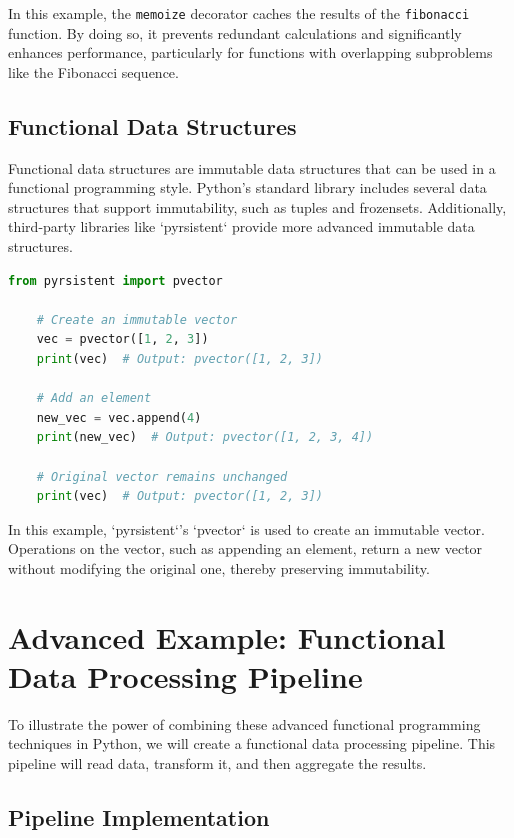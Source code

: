 \documentclass[a4paper]{article}
\begin{document}
In this example, the \texttt{memoize} decorator caches the results of the \texttt{fibonacci} function. By doing so, it prevents redundant calculations and significantly enhances performance, particularly for functions with overlapping subproblems like the Fibonacci sequence.

\subsection{Functional Data Structures}
Functional data structures are immutable data structures that can be used in a functional programming style. Python's standard library includes several data structures that support immutability, such as tuples and frozensets. Additionally, third-party libraries like `pyrsistent` provide more advanced immutable data structures.

\begin{lstlisting}[language=Python, caption=Functional Data Structures Example]
    from pyrsistent import pvector

    # Create an immutable vector
    vec = pvector([1, 2, 3])
    print(vec)  # Output: pvector([1, 2, 3])

    # Add an element
    new_vec = vec.append(4)
    print(new_vec)  # Output: pvector([1, 2, 3, 4])

    # Original vector remains unchanged
    print(vec)  # Output: pvector([1, 2, 3])
\end{lstlisting}

In this example, `pyrsistent`'s `pvector` is used to create an immutable vector. Operations on the vector, such as appending an element, return a new vector without modifying the original one, thereby preserving immutability.

\newpage
\section{Advanced Example: Functional Data Processing Pipeline}
To illustrate the power of combining these advanced functional programming techniques in Python, we will create a functional data processing pipeline. This pipeline will read data, transform it, and then aggregate the results. 

\subsection{Pipeline Implementation}
\end{document}
